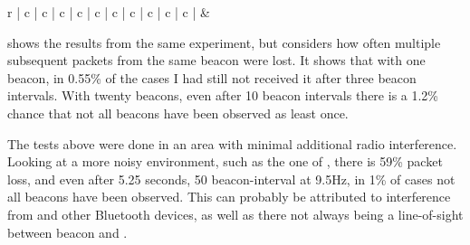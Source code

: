 \begin{table}
    \begin{tabular}{r | c | c | c | c | c | c | c | c | c | c |}
        &  \\
    \end{tabular}
    \caption{Measured chance that not all beacons have been observed at different listening intervals.}
    \label{tbl:rss-packet-loss-empirical}
\end{table}

 shows the results from the same experiment, but considers how often multiple subsequent packets from the same beacon were lost.
It shows that with one beacon, in 0.55\% of the cases I had still not received it after three beacon intervals.
With twenty beacons, even after 10 beacon intervals there is a 1.2\% chance that not all beacons have been observed as least once.

The tests above were done in an area with minimal additional radio interference.
Looking at a more noisy environment, such as the one of , there is 59\% packet loss, and even after 5.25 seconds, 50 beacon-interval at 9.5Hz, in 1\% of cases not all beacons have been observed.
This can probably be attributed to interference from \wifi and other Bluetooth devices, as well as there not always being a line-of-sight between beacon and \device.
